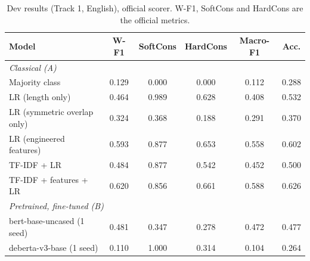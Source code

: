 \begin{table}[t]
\centering
\small
\begin{tabular}{lccccc}
\toprule
Model & W-F1 & SoftCons & HardCons & Macro-F1 & Acc. \\
\midrule
\multicolumn{6}{l}{\textit{Classical (A)}} \\
Majority class & 0.129 & 0.000 & 0.000 & 0.112 & 0.288 \\
LR (length only) & 0.464 & 0.989 & 0.628 & 0.408 & 0.532 \\
LR (symmetric overlap only) & 0.324 & 0.368 & 0.188 & 0.291 & 0.370 \\
LR (engineered features) & 0.593 & 0.877 & 0.653 & 0.558 & 0.602 \\
TF-IDF + LR & 0.484 & 0.877 & 0.542 & 0.452 & 0.500 \\
TF-IDF + features + LR & 0.620 & 0.856 & 0.661 & 0.588 & 0.626 \\
\multicolumn{6}{l}{\textit{Pretrained, fine-tuned (B)}} \\
bert-base-uncased (1 seed) & 0.481 & 0.347 & 0.278 & 0.472 & 0.477 \\
deberta-v3-base (1 seed) & 0.110 & 1.000 & 0.314 & 0.104 & 0.264 \\
\bottomrule
\end{tabular}
\caption{Dev results (Track 1, English), official scorer. W-F1, SoftCons and HardCons are the official metrics.}
\label{tab:results}
\end{table}
